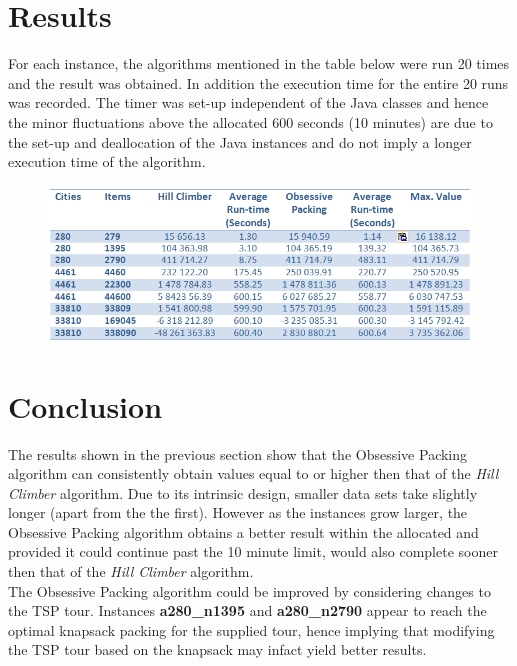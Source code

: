\documentclass[a4paper,12pt]{article}
\begin{document}
\section{Results}
For each instance, the algorithms mentioned in the table below were run 20 times and the result was obtained. In addition the execution time for the entire 20 runs was recorded. The timer was set-up independent of the Java classes and hence the minor fluctuations above the allocated 600 seconds (10 minutes) are due to the set-up and deallocation of the Java instances and do not imply a longer execution time of the algorithm.
\begin{figure}[h]
\centering
\includegraphics[width=\linewidth]{ResultsTable.png}
\end{figure}

\section{Conclusion}
The results shown in the previous section show that the Obsessive Packing algorithm can consistently obtain values equal to or higher then that of the \textit{Hill Climber} algorithm. Due to its intrinsic design, smaller data sets take slightly longer (apart from the the first). However as the instances grow larger,  the Obsessive Packing algorithm obtains a better result within the allocated and provided it could continue past the 10 minute limit, would also complete sooner then that of the \textit{Hill Climber} algorithm.\\

The Obsessive Packing algorithm could be improved by considering changes to the TSP tour. Instances {\bf a280\_n1395} and {\bf a280\_n2790} appear to reach the optimal knapsack packing for the supplied tour, hence implying that modifying the TSP tour based on the knapsack may infact yield better results.
\end{document}
